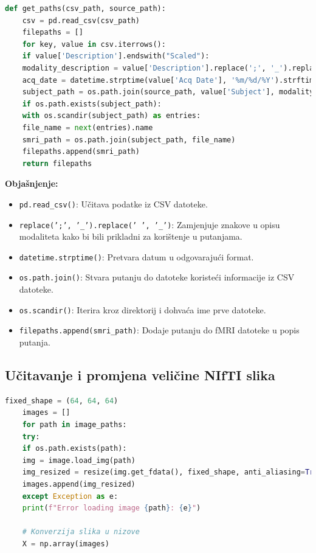 \documentclass[zavrsnirad]{fer}
\begin{document}
\begin{lstlisting}[language=Python, caption={Metoda get\_paths}]
	def get_paths(csv_path, source_path):
	csv = pd.read_csv(csv_path)
	filepaths = []
	for key, value in csv.iterrows():
	if value['Description'].endswith("Scaled"):
	modality_description = value['Description'].replace(';', '_').replace(' ', '_')
	acq_date = datetime.strptime(value['Acq Date'], '%m/%d/%Y').strftime('%Y-%m-%d')
	subject_path = os.path.join(source_path, value['Subject'], modality_description, acq_date, value['Image Data ID'])
	if os.path.exists(subject_path):
	with os.scandir(subject_path) as entries:
	file_name = next(entries).name
	smri_path = os.path.join(subject_path, file_name)
	filepaths.append(smri_path)
	return filepaths
\end{lstlisting}

\noindent \textbf{Objašnjenje:}
\begin{itemize}
	\item \texttt{pd.read\_csv()}: Učitava podatke iz CSV datoteke.
	\item \texttt{replace(';', '\_').replace(' ', '\_')}: Zamjenjuje znakove u opisu modaliteta kako bi bili prikladni za korištenje u putanjama.
	\item \texttt{datetime.strptime()}: Pretvara datum u odgovarajući format.
	\item \texttt{os.path.join()}: Stvara putanju do datoteke koristeći informacije iz CSV datoteke.
	\item \texttt{os.scandir()}: Iterira kroz direktorij i dohvaća ime prve datoteke.
	\item \texttt{filepaths.append(smri\_path)}: Dodaje putanju do fMRI datoteke u popis putanja.
\end{itemize}

\subsection{Učitavanje i promjena veličine NIfTI slika}

\begin{lstlisting}[language=Python, caption={Učitavanje i promjena veličine NIfTI slika}]
	fixed_shape = (64, 64, 64)
	images = []
	for path in image_paths:
	try:
	if os.path.exists(path):
	img = image.load_img(path)
	img_resized = resize(img.get_fdata(), fixed_shape, anti_aliasing=True)
	images.append(img_resized)
	except Exception as e:
	print(f"Error loading image {path}: {e}")
	
	# Konverzija slika u nizove
	X = np.array(images)
\end{lstlisting}
\end{document}
